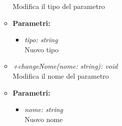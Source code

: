 \begin{itemize}
\begin{itemize}
            			Modifica il tipo del parametro
            			\item \textbf{Parametri:}\\
            				\begin{itemize}
            					\item \emph{tipo: string}\\
            					Nuovo tipo
            				\end{itemize}
            			\item \emph{+changeNome(nome: string): void}\\
            			Modifica il nome del parametro
            			\item \textbf{Parametri:}\\
            				\begin{itemize}
            					\item \emph{nome: string}\\
            					Nuovo nome
            				\end{itemize}            			
          			\end{itemize}
          		\end{itemize}
